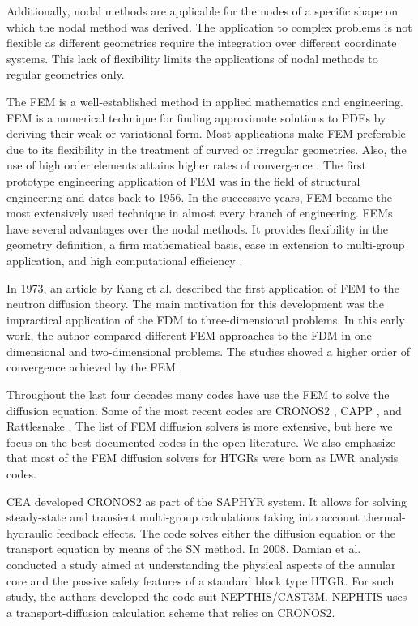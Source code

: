 \documentclass[11pt,letterpaper]{article}
\begin{document}
Additionally, nodal methods are applicable for the nodes of a specific shape on which the nodal method was derived.
The application to complex problems is not flexible as different geometries require the integration over different coordinate systems.
This lack of flexibility limits the applications of nodal methods to regular geometries only.

The \gls{FEM} is a well-established method in applied mathematics and engineering.
\gls{FEM} is a numerical technique for finding approximate solutions to \glspl{PDE} by deriving their weak or variational form.
Most applications make \gls{FEM} preferable due to its flexibility in the treatment of curved or irregular geometries.
Also, the use of high order elements attains higher rates of convergence \cite{cavdar_finite_2004}.
The first prototype engineering application of \gls{FEM} was in the field of structural engineering and dates back to 1956.
In the successive years, \gls{FEM} became the most extensively used technique in almost every branch of engineering.
\glspl{FEM} have several advantages over the nodal methods.
It provides flexibility in the geometry definition, a firm mathematical basis, ease in extension to multi-group application, and high computational efficiency \cite{lee_development_2008}.

In 1973, an article by Kang et al. \cite{kang_finite_1973} described the first application of \gls{FEM} to the neutron diffusion theory.
The main motivation for this development was the impractical application of the \gls{FDM} to three-dimensional problems.
In this early work, the author compared different \gls{FEM} approaches to the \gls{FDM} in one-dimensional and two-dimensional problems.
The studies showed a higher order of convergence achieved by the \gls{FEM}.

Throughout the last four decades many codes have use the \gls{FEM} to solve the diffusion equation.
Some of the most recent codes are CRONOS2 \cite{lautard_cronos_1990}, CAPP \cite{lee_development_2011}, and Rattlesnake \cite{wang_rattlesnake_2019}.
The list of \gls{FEM} diffusion solvers is more extensive, but here we focus on the best documented codes in the open literature.
We also emphasize that most of the \gls{FEM} diffusion solvers for \glspl{HTGR} were born as \gls{LWR} analysis codes.

\gls{CEA} developed CRONOS2 \cite{lautard_cronos_1990} as part of the SAPHYR system.
It allows for solving steady-state and transient multi-group calculations taking into account thermal-hydraulic feedback effects.
The code solves either the diffusion equation or the transport equation by means of the SN method.
In 2008, Damian et al. \cite{damian_vhtr_2008} conducted a study aimed at understanding the physical aspects of the annular core and the passive safety features of a standard block type \gls{HTGR}.
For such study, the authors developed the code suit NEPTHIS/CAST3M.
NEPHTIS uses a transport-diffusion calculation scheme that relies on CRONOS2.
\end{document}
